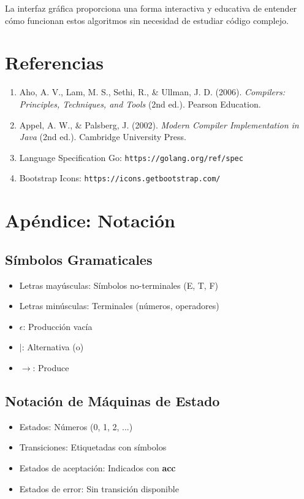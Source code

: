\documentclass[12pt]{article}
\begin{document}
La interfaz gráfica proporciona una forma interactiva y educativa de entender cómo funcionan estos algoritmos sin necesidad de estudiar código complejo.

\section{Referencias}

\begin{enumerate}
    \item Aho, A. V., Lam, M. S., Sethi, R., \& Ullman, J. D. (2006). 
    \textit{Compilers: Principles, Techniques, and Tools} (2nd ed.). Pearson Education.
    
    \item Appel, A. W., \& Palsberg, J. (2002). 
    \textit{Modern Compiler Implementation in Java} (2nd ed.). Cambridge University Press.
    
    \item Language Specification Go: \texttt{https://golang.org/ref/spec}
    
    \item Bootstrap Icons: \texttt{https://icons.getbootstrap.com/}
\end{enumerate}

\section{Apéndice: Notación}

\subsection{Símbolos Gramaticales}

\begin{itemize}
    \item Letras mayúsculas: Símbolos no-terminales (E, T, F)
    \item Letras minúsculas: Terminales (números, operadores)
    \item $\epsilon$: Producción vacía
    \item $|$: Alternativa (o)
    \item $\rightarrow$: Produce
\end{itemize}

\subsection{Notación de Máquinas de Estado}

\begin{itemize}
    \item Estados: Números (0, 1, 2, ...)
    \item Transiciones: Etiquetadas con símbolos
    \item Estados de aceptación: Indicados con \textbf{acc}
    \item Estados de error: Sin transición disponible
\end{itemize}
\end{document}
